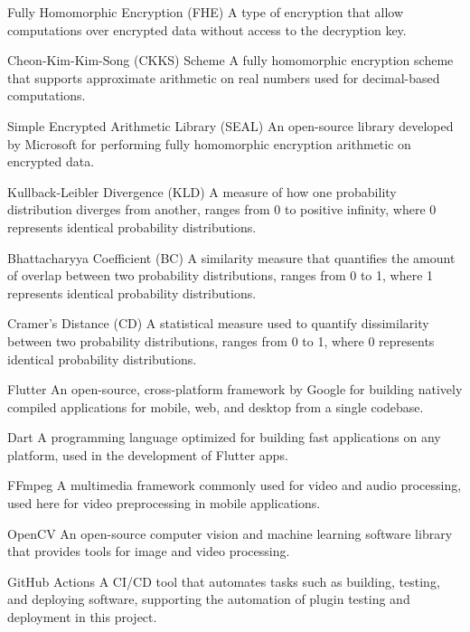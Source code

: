 \begin{glossary}
\item[Fully Homomorphic Encryption (FHE)] A type of encryption that allow computations over encrypted data without access to the decryption key.

\item[Cheon-Kim-Kim-Song (CKKS) Scheme] A fully homomorphic encryption scheme that supports approximate arithmetic on real numbers used for decimal-based computations.

\item[Simple Encrypted Arithmetic Library (SEAL)] An open-source library developed by Microsoft for performing fully homomorphic encryption arithmetic on encrypted data.

\item[Kullback-Leibler Divergence (KLD)] A measure of how one probability distribution diverges from another, ranges from 0 to positive infinity, where 0 represents identical probability distributions.

\item[Bhattacharyya Coefficient (BC)] A similarity measure that quantifies the amount of overlap between two probability distributions, ranges from 0 to 1, where 1 represents identical probability distributions.

\item[Cramer's Distance (CD)] A statistical measure used to quantify dissimilarity between two probability distributions, ranges from 0 to 1, where 0 represents identical probability distributions.

\item[Flutter] An open-source, cross-platform framework by Google for building natively compiled applications for mobile, web, and desktop from a single codebase.

\item[Dart] A programming language optimized for building fast applications on any platform, used in the development of Flutter apps.

\item[FFmpeg] A multimedia framework commonly used for video and audio processing, used here for video preprocessing in mobile applications.

\item[OpenCV] An open-source computer vision and machine learning software library that provides tools for image and video processing.

\item[GitHub Actions] A CI/CD tool that automates tasks such as building, testing, and deploying software, supporting the automation of plugin testing and deployment in this project.

\end{glossary}
